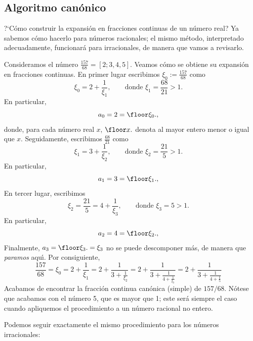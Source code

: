 \subsection{Algoritmo can\'onico}

 ?`C\'omo construir la expansi\'on en fracciones continuas
de un n\'umero real? Ya sabemos c\'omo hacerlo para n\'umeros racionales; el
mismo m\'etodo, interpretado adecuadamente, funcionar\'a para irracionales, de
manera que vamos a revisarlo. 

Consideramos el n\'umero $\frac{157}{68}=[2;3,4,5]$. Veamos c\'omo se obtiene su
expansi\'on en fracciones continuas. En primer lugar escribimos
$\xi_0:=\frac{157}{68}$ como
$$
\xi_0=2+\frac1{\xi_1}, \qquad \text{donde }\xi_1=\frac{68}{21}>1.
$$
En particular, 
$$
a_0=2=\floor \xi_0.,
$$
donde, para cada n\'umero real $x$, $\floor x.$ denota al mayor entero menor o
igual que $x$. Seguidamente, escribimos $\frac{68}{21}$ como
$$
\xi_1=3+\frac1{\xi_2}, \qquad \text{donde }\xi_2=\frac{21}{5}>1.
$$
En particular,
$$
a_1=3=\floor \xi_1.,
$$
En tercer lugar, escribimos
$$
\xi_2=\frac{21}5=4+\frac1{\xi_3}, \qquad \text{donde }\xi_3=5>1.
$$
En particular,
$$
a_2=4=\floor \xi_2.,
$$
Finalmente, $a_3=\floor \xi_3.=\xi_3$ no se puede descomponer m\'as, de manera
que \emph{paramos} aqu\'{\i}. Por consiguiente,
$$
\frac{157}{68}=\xi_0=2+\displaystyle\frac1{\xi_1}=2+\frac1{3+\displaystyle\frac1
{\xi_2}}=2+\frac1{3+\displaystyle\frac1{4+\displaystyle\frac1{\xi_3}}}
=2+\displaystyle\frac1{3+\displaystyle\frac1{4+\displaystyle\frac1{5}}}
$$
Acabamos de encontrar la fracci\'on continua can\'onica (simple) de $157/68$.
N\'otese que acabamos con el n\'umero 5, que es mayor que 1; este ser\'a siempre
el caso cuando apliquemos el procedimiento a un n\'umero racional no entero. 

Podemos seguir exactamente el mismo procedimiento para los n\'umeros
irracionales:


